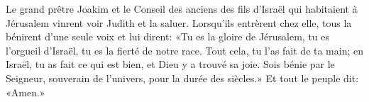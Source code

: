 Le grand prêtre Joakim
		et le Conseil des anciens des fils d'Israël qui habitaient à Jérusalem
	vinrent voir Judith et la saluer.
Lorsqu'ils entrèrent chez elle, tous la bénirent d'une seule voix et lui dirent:
	«Tu es la gloire de Jérusalem, tu es l'orgueil d'Israël,
	tu es la fierté de notre race.
Tout cela, tu l'as fait de ta main;
	en Israël, tu as fait ce qui est bien, et Dieu y a trouvé sa joie.
Sois bénie par le Seigneur, souverain de l'univers, pour la durée des siècles.»
	Et tout le peuple dit: «Amen.»
